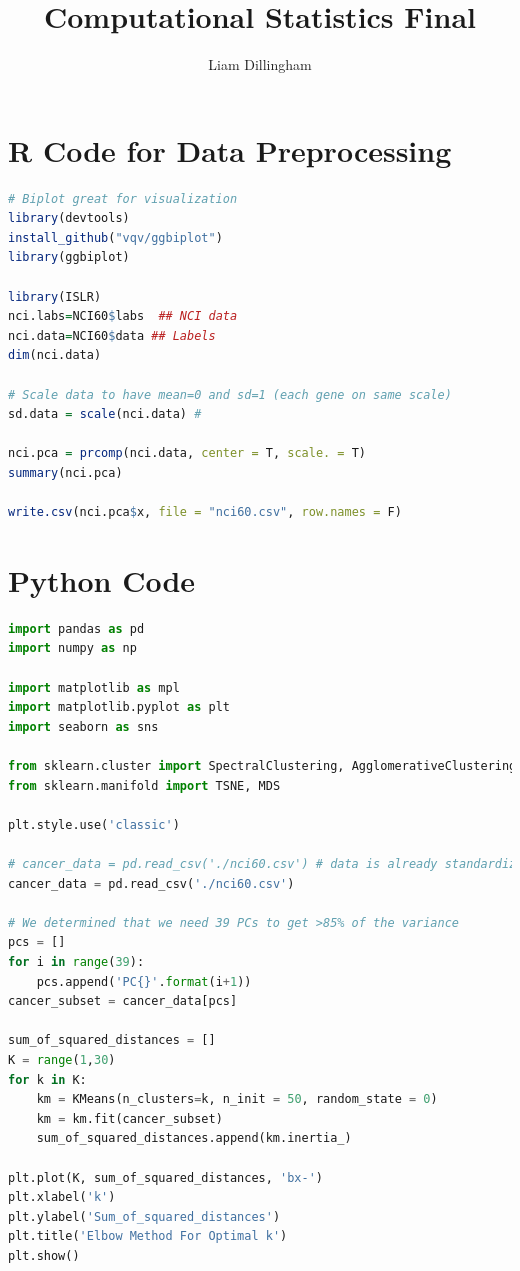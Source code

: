 \documentclass[20pt]{article} %
\title{Computational Statistics Final}
\author{Liam Dillingham}
\begin{document}
\maketitle

\section{R Code for Data Preprocessing}
\begin{lstlisting}[language=R]
# Biplot great for visualization
library(devtools)
install_github("vqv/ggbiplot")
library(ggbiplot)

library(ISLR)
nci.labs=NCI60$labs  ## NCI data
nci.data=NCI60$data ## Labels
dim(nci.data)

# Scale data to have mean=0 and sd=1 (each gene on same scale)
sd.data = scale(nci.data) #

nci.pca = prcomp(nci.data, center = T, scale. = T)
summary(nci.pca)

write.csv(nci.pca$x, file = "nci60.csv", row.names = F)
\end{lstlisting}

\section{Python Code}
\begin{lstlisting}[language=python]
import pandas as pd
import numpy as np

import matplotlib as mpl 
import matplotlib.pyplot as plt 
import seaborn as sns

from sklearn.cluster import SpectralClustering, AgglomerativeClustering, DBSCAN, KMeans
from sklearn.manifold import TSNE, MDS

plt.style.use('classic')

# cancer_data = pd.read_csv('./nci60.csv') # data is already standardized
cancer_data = pd.read_csv('./nci60.csv')

# We determined that we need 39 PCs to get >85% of the variance
pcs = []
for i in range(39):
    pcs.append('PC{}'.format(i+1))
cancer_subset = cancer_data[pcs]

sum_of_squared_distances = []
K = range(1,30)
for k in K:
    km = KMeans(n_clusters=k, n_init = 50, random_state = 0)
    km = km.fit(cancer_subset)
    sum_of_squared_distances.append(km.inertia_)

plt.plot(K, sum_of_squared_distances, 'bx-')
plt.xlabel('k')
plt.ylabel('Sum_of_squared_distances')
plt.title('Elbow Method For Optimal k')
plt.show()
\end{lstlisting}
\end{document}
